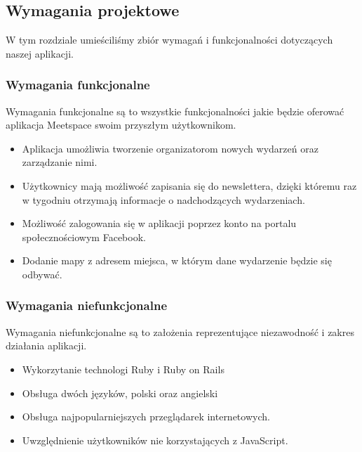 

\subsection{Wymagania projektowe}
W tym rozdziale umieściliśmy zbiór wymagań i funkcjonalności dotyczących naszej aplikacji.
  \subsubsection{Wymagania funkcjonalne}
    Wymagania funkcjonalne są to wszystkie funkcjonalności jakie będzie oferować aplikacja Meetspace swoim przyszłym użytkownikom.
    \begin{itemize}
      \item Aplikacja umożliwia tworzenie organizatorom nowych wydarzeń oraz zarządzanie nimi.
      \item Użytkownicy mają możliwość zapisania się do newslettera, dzięki któremu raz w tygodniu otrzymają informacje o nadchodzących wydarzeniach.
      \item Możliwość zalogowania się w aplikacji poprzez konto na portalu społecznościowym Facebook.
      \item Dodanie mapy z adresem miejsca, w którym dane wydarzenie będzie się odbywać.
    \end{itemize}
  \subsubsection{Wymagania niefunkcjonalne}
  Wymagania niefunkcjonalne są to założenia reprezentujące niezawodność i zakres działania aplikacji.
    \begin{itemize}
      \item Wykorzytanie technologi Ruby i Ruby on Rails
      \item Obsługa dwóch języków, polski oraz angielski
      \item Obsługa najpopularniejszych przeglądarek internetowych.
      \item Uwzględnienie użytkowników nie korzystających z JavaScript.
    \end{itemize}

